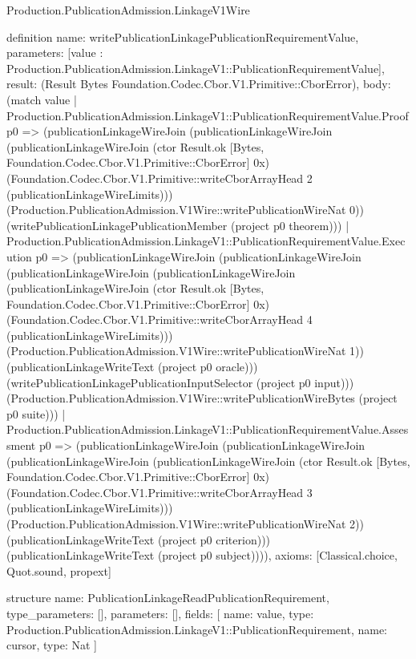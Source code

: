 \begin{lexlean}{Production.PublicationAdmission.LinkageV1Wire}
\begin{semanticmodule}
definition{
  name: writePublicationLinkagePublicationRequirementValue,
  parameters: [value : Production.PublicationAdmission.LinkageV1::PublicationRequirementValue],
  result: (Result Bytes Foundation.Codec.Cbor.V1.Primitive::CborError),
  body: (match value
    | Production.PublicationAdmission.LinkageV1::PublicationRequirementValue.Proof p0 => (publicationLinkageWireJoin (publicationLinkageWireJoin (publicationLinkageWireJoin (ctor Result.ok [Bytes, Foundation.Codec.Cbor.V1.Primitive::CborError] 0x) (Foundation.Codec.Cbor.V1.Primitive::writeCborArrayHead 2 (publicationLinkageWireLimits))) (Production.PublicationAdmission.V1Wire::writePublicationWireNat 0)) (writePublicationLinkagePublicationMember (project p0 theorem)))
    | Production.PublicationAdmission.LinkageV1::PublicationRequirementValue.Execution p0 => (publicationLinkageWireJoin (publicationLinkageWireJoin (publicationLinkageWireJoin (publicationLinkageWireJoin (publicationLinkageWireJoin (ctor Result.ok [Bytes, Foundation.Codec.Cbor.V1.Primitive::CborError] 0x) (Foundation.Codec.Cbor.V1.Primitive::writeCborArrayHead 4 (publicationLinkageWireLimits))) (Production.PublicationAdmission.V1Wire::writePublicationWireNat 1)) (publicationLinkageWriteText (project p0 oracle))) (writePublicationLinkagePublicationInputSelector (project p0 input))) (Production.PublicationAdmission.V1Wire::writePublicationWireBytes (project p0 suite)))
    | Production.PublicationAdmission.LinkageV1::PublicationRequirementValue.Assessment p0 => (publicationLinkageWireJoin (publicationLinkageWireJoin (publicationLinkageWireJoin (publicationLinkageWireJoin (ctor Result.ok [Bytes, Foundation.Codec.Cbor.V1.Primitive::CborError] 0x) (Foundation.Codec.Cbor.V1.Primitive::writeCborArrayHead 3 (publicationLinkageWireLimits))) (Production.PublicationAdmission.V1Wire::writePublicationWireNat 2)) (publicationLinkageWriteText (project p0 criterion))) (publicationLinkageWriteText (project p0 subject)))),
  axioms: [Classical.choice, Quot.sound, propext]
}

structure{
  name: PublicationLinkageReadPublicationRequirement,
  type_parameters: [],
  parameters: [],
  fields: [
    {name: value, type: Production.PublicationAdmission.LinkageV1::PublicationRequirement},
    {name: cursor, type: Nat}
  ]
}


\end{semanticmodule}
\end{lexlean}
